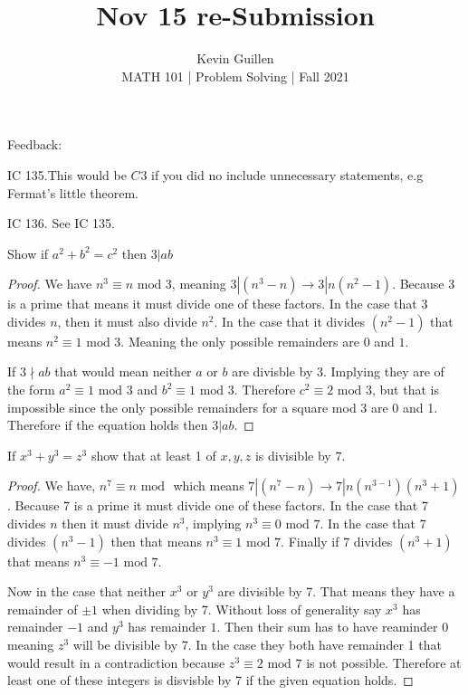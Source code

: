 \documentclass[11pt]{article}
\newenvironment{problem}[2][Problem\!]{\begin{trivlist}
\item[\hskip \labelsep {\bfseries #1}\hskip \labelsep {\bfseries #2}]}{\end{trivlist}}
\begin{document}
 
\title{Nov 15 re-Submission}
\author{Kevin Guillen\\[0.5em]
MATH 101 | Problem Solving | Fall 2021}
\date{} 
\maketitle

Feedback:

IC 135.This would be $C^{}3$ if you did no include unnecessary statements, e.g
Fermat’s little theorem.

IC 136. See IC 135.

\begin{tcolorbox}
  \begin{problem} {IC | 11/10 | 135.} Show if $a^{2} + b^{2} = c^{2}$ then $3| ab$
  \end{problem}
\end{tcolorbox}
\begin{proof}
  We have $n^{3} \equiv n \text{ mod }3$, meaning $3|(n^{3}-n)\rightarrow 3|n(n^{2}-1)$. Because 3 is a prime that means it must divide one of these factors. In the case that 3 divides $n$, then it must also divide $n^{2}$. In the case that it divides $(n^{2}-1)$ that means $n^{2}\equiv 1 \text{ mod }3$. Meaning the only possible remainders are $0$ and $1$. 

  If $3 \nmid ab$ that would mean neither $a$ or $b$ are divisble by $3$. Implying they are of the form $a^{2} \equiv 1\text{ mod }3$ and $b^{2} \equiv 1\text{ mod }3$. Therefore $c^{2} \equiv 2 \text{ mod } 3$, but that is impossible since the only possible remainders for a square mod 3 are 0 and 1. Therefore if the equation holds then $3|ab$.
\end{proof}

\begin{tcolorbox}
  \begin{problem} {IC | 11/10 | 136.} If $x^{3} + y^{3} = z^{3}$ show that at least 1 of $x,y,z$ is divisible by $7$.    
  \end{problem}
\end{tcolorbox}
\begin{proof}
  We have, $n^{7} \equiv n \text{ mod }$ which means $7| (n^{7}-n) \rightarrow 7|n(n^{3-1})(n^{3} + 1)$. Because 7 is a prime it must divide one of these factors. In the case that 7 divides $n$ then it must divide $n^{3}$, implying $n^{3} \equiv 0 \text{ mod }7$. In the case that 7 divides $(n^{3}-1)$ then that means $n^{3} \equiv 1 \text{ mod }7 $. Finally if 7 divides $(n^{3} + 1)$ that means $n^{3} \equiv -1 \text{ mod }7$. 

  Now in the case that neither $x^{3}$ or $y^{3}$ are divisible by 7. That means they have a remainder of $\pm 1$ when dividing by 7. Without loss of generality say $x^{3}$ has remainder $-1$ and $y^{3}$ has remainder $1$. Then their sum has to have reaminder 0 meaning $z^{3}$ will be divisible by 7. In the case they both have remainder 1 that would result in a contradiction because $z^{3} \equiv 2 \text{ mod }7$ is not possible. Therefore at least one of these integers is disvisble by 7 if the given equation holds. 
\end{proof}
\end{document}
